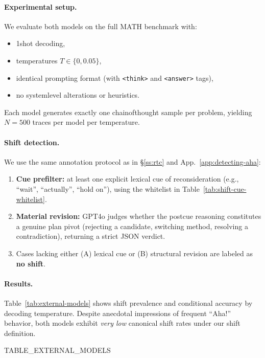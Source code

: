 \paragraph{Experimental setup.}
We evaluate both models on the full \textsc{MATH} benchmark with:
\begin{itemize}[leftmargin=*]
    \item 1\textendash shot decoding,
    \item temperatures $T\in\{0, 0.05\}$,
    \item identical prompting format (with \texttt{<think>} and \texttt{<answer>} tags),
    \item no system\textendash level alterations or heuristics.
\end{itemize}
Each model generates exactly one chain\textendash of\textendash thought sample per problem, yielding $N{=}500$ traces per model per temperature.

\paragraph{Shift detection.}
We use the same annotation protocol as in \S\ref{ss:rtc} and App.~\ref{app:detecting-aha}:
\begin{enumerate}[leftmargin=*]
    \item \textbf{Cue prefilter:} at least one explicit lexical cue of reconsideration (e.g., ``wait'', ``actually'', ``hold on''), using the whitelist in Table~\ref{tab:shift-cue-whitelist}.
    \item \textbf{Material revision:} GPT\textendash 4o judges whether the post\textendash cue reasoning constitutes a genuine plan pivot (rejecting a candidate, switching method, resolving a contradiction), returning a strict JSON verdict.
    \item Cases lacking either (A) lexical cue or (B) structural revision are labeled as \textbf{no shift}.
\end{enumerate}

\paragraph{Results.}
Table~\ref{tab:external-models} shows shift prevalence and conditional accuracy by decoding temperature. Despite anecdotal impressions of frequent ``Aha!'' behavior, both models exhibit \emph{very low} canonical shift rates under our shift definition.

{{TABLE_EXTERNAL_MODELS}}

